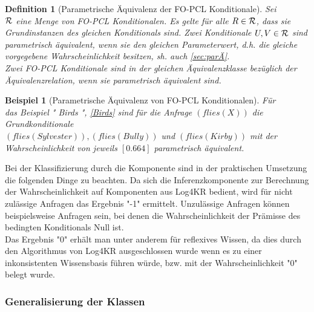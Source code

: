 \documentclass[draft]{scrreprt}
\newtheorem{Def}{Definition }[section]
\newtheorem{Bsp}{Beispiel}[section]
\begin{document}
\begin{Def}[Parametrische Äquivalenz der FO-PCL Konditionale] \label{Äquivalenz in FO-PCL}   
	Sei\\ $  \cal{R} $ eine Menge von FO-PCL Konditionalen. Es gelte für alle $ R \in \cal{R} $, dass sie Grundinstanzen des gleichen Konditionals sind. Zwei Konditionale $ U,V \in \cal{R} $ sind parametrisch äquivalent, wenn sie den gleichen Parameterwert, d.h. die gleiche vorgegebene Wahrscheinlichkeit besitzen, sh. auch \ref{sec:parÄ}.\\
	Zwei FO-PCL Konditionale sind in der gleichen Äquivalenzklasse bezüglich der Äquivalenzrelation, wenn sie parametrisch äquivalent sind. \label{Äquivalenzklassen} 
\end{Def}


\begin{Bsp}[Parametrische Äquivalenz von FO-PCL Konditionalen]\label{Bsp:parametische Äquivalenz}
	Für \\ das Beispiel "{} Birds "{}, \ref{Birds} sind für die Anfrage $ (flies(X)) $ die Grundkonditionale \\ $ (flies(Sylvester)), (flies(Bully)) $ und $ (flies(Kirby)) $ mit der Wahrscheinlichkeit von jeweils $ [0.664] $ parametrisch äquivalent.
\end{Bsp}	



Bei der Klassifizierung durch die Komponente sind in der praktischen Umsetzung die folgenden Dinge zu beachten. 
Da sich die Inferenzkomponente zur Berechnung der Wahrscheinlichkeit auf Komponenten aus Log4KR bedient, wird für nicht zulässige Anfragen das Ergebnis "{}-1"{} ermittelt. Unzulässige Anfragen können beispielsweise Anfragen sein, bei denen die Wahrscheinlichkeit der Prämisse des bedingten Konditionals Null ist.\\
Das Ergebnis  "{}0"{} erhält man unter anderem für reflexives Wissen, da dies durch den Algorithmus von Log4KR ausgeschlossen wurde wenn es zu einer inkonsistenten Wissensbasis führen würde, bzw. mit der Wahrscheinlichkeit  "{}0"{} belegt wurde. 
	
	
	
	
\subsubsection{Generalisierung der Klassen}
\end{document}
